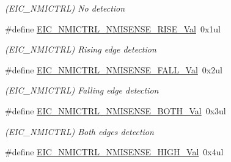 \begin{DoxyCompactItemize}
\begin{DoxyCompactList}\small\item\em (E\+I\+C\+\_\+\+N\+M\+I\+C\+T\+R\+L) No detection \end{DoxyCompactList}\item 
\hypertarget{group___s_a_m_l21___e_i_c_ga40a369ae631516099e85c14096312797}{}\#define \hyperlink{group___s_a_m_l21___e_i_c_ga40a369ae631516099e85c14096312797}{E\+I\+C\+\_\+\+N\+M\+I\+C\+T\+R\+L\+\_\+\+N\+M\+I\+S\+E\+N\+S\+E\+\_\+\+R\+I\+S\+E\+\_\+\+Val}~0x1ul\label{group___s_a_m_l21___e_i_c_ga40a369ae631516099e85c14096312797}

\begin{DoxyCompactList}\small\item\em (E\+I\+C\+\_\+\+N\+M\+I\+C\+T\+R\+L) Rising edge detection \end{DoxyCompactList}\item 
\hypertarget{group___s_a_m_l21___e_i_c_gaa0a05bae1746f2942044c926350f1ebe}{}\#define \hyperlink{group___s_a_m_l21___e_i_c_gaa0a05bae1746f2942044c926350f1ebe}{E\+I\+C\+\_\+\+N\+M\+I\+C\+T\+R\+L\+\_\+\+N\+M\+I\+S\+E\+N\+S\+E\+\_\+\+F\+A\+L\+L\+\_\+\+Val}~0x2ul\label{group___s_a_m_l21___e_i_c_gaa0a05bae1746f2942044c926350f1ebe}

\begin{DoxyCompactList}\small\item\em (E\+I\+C\+\_\+\+N\+M\+I\+C\+T\+R\+L) Falling edge detection \end{DoxyCompactList}\item 
\hypertarget{group___s_a_m_l21___e_i_c_ga7c987cbee9b60bfd4e68ddd11982a512}{}\#define \hyperlink{group___s_a_m_l21___e_i_c_ga7c987cbee9b60bfd4e68ddd11982a512}{E\+I\+C\+\_\+\+N\+M\+I\+C\+T\+R\+L\+\_\+\+N\+M\+I\+S\+E\+N\+S\+E\+\_\+\+B\+O\+T\+H\+\_\+\+Val}~0x3ul\label{group___s_a_m_l21___e_i_c_ga7c987cbee9b60bfd4e68ddd11982a512}

\begin{DoxyCompactList}\small\item\em (E\+I\+C\+\_\+\+N\+M\+I\+C\+T\+R\+L) Both edges detection \end{DoxyCompactList}\item 
\hypertarget{group___s_a_m_l21___e_i_c_ga30c9d119b917f1bec88af90d0c7fa180}{}\#define \hyperlink{group___s_a_m_l21___e_i_c_ga30c9d119b917f1bec88af90d0c7fa180}{E\+I\+C\+\_\+\+N\+M\+I\+C\+T\+R\+L\+\_\+\+N\+M\+I\+S\+E\+N\+S\+E\+\_\+\+H\+I\+G\+H\+\_\+\+Val}~0x4ul\label{group___s_a_m_l21___e_i_c_ga30c9d119b917f1bec88af90d0c7fa180}


\end{DoxyCompactItemize}
